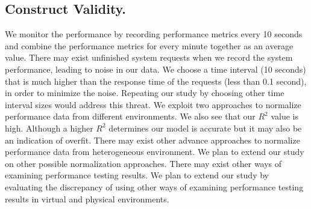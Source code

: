 \subsection{Construct Validity.}
We monitor the performance by recording performance metrics every 10 seconds and combine the performance metrics for every minute together as an average value. There may exist unfinished system requests when we record the system performance, leading to noise in our data. We choose a time interval (10 seconds) that is much higher than the response time of the requests (less than 0.1 second), in order to minimize the noise. Repeating our study by choosing other time interval sizes would address this threat. We exploit two approaches to normalize performance data from different environments. We also see that our {$R^2$} value is high. Although a higher {$R^2$} determines our model is accurate but it may also be an indication of overfit. There may exist other advance approaches to normalize performance data from heterogeneous environment. We plan to extend our study on other possible normalization approaches. There may exist other ways of examining performance testing results. We plan to extend our study by evaluating the discrepancy of using other ways of examining performance testing results in virtual and physical environments.




